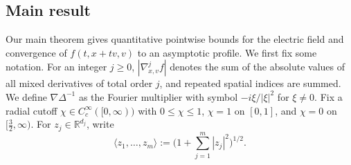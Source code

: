 \documentclass[reqno,11pt]{amsart}
\numberwithin{equation}{section}
\begin{document}
\subsection{Main result}
Our main theorem gives quantitative pointwise bounds for the electric
field and convergence of $f(t,x+tv,v)$ to an asymptotic profile.
We first fix some notation. For an integer $j\ge0$, $|\nabla_{x,v}^j f|$ denotes the sum of the
absolute values of all mixed derivatives of total order $j$, and
repeated spatial indices are summed. We define $\nabla\Delta^{-1}$
as the Fourier multiplier with symbol $-i\xi/|\xi|^2$ for $\xi\ne0$.
Fix a radial cutoff $\chi\in C_c^\infty([0,\infty))$ with
$0\le\chi\le1$, $\chi=1$ on $[0,1]$, and $\chi=0$ on
$[\frac32,\infty)$. For $z_j\in\mathbb R^{d_j}$, write
\[
\langle z_1,\ldots,z_m\rangle
:=\big(1+\sum_{j=1}^m|z_j|^2\big)^{1/2}.
\]
\end{document}
